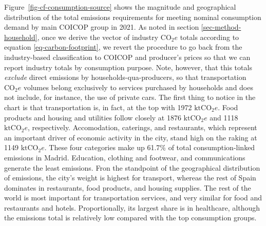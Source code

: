 \documentclass[
  10pt,
  twocolumn]{aft}
\begin{document}
Figure~\ref{fig-cf-consumption-source} shows the magnitude and
geographical distribution of the total emissions requirements for
meeting nominal consumption demand by main COICOP group in 2021. As
noted in section \ref{sec-method-household}, once we derive the vector
of industry \(\text{CO}_2e\) totals according to equation
\ref{eq-carbon-footprint}, we revert the procedure to go back from the
industry-based classification to COICOP and producer's prices so that we
can report industry totals by consumption purpose. Note, however, that
this totals \emph{exclude} direct emissions by households-qua-producers,
so that transportation \(\text{CO}_2e\) volumes belong exclusively to
services purchased by households and does not include, for instance, the
use of private cars. The first thing to notice in the chart is that
transportation is, in fact, at the top with 1972 \(\text{ktCO}_2e\).
Food products and housing and utilities follow closely at 1876
\(\text{ktCO}_2e\) and 1118 \(\text{ktCO}_2e\), respectively.
Accomodation, caterings, and restaurants, which represent an important
driver of economic activity in the city, stand high on the raking at
1149 \(\text{ktCO}_2e\). These four categories make up 61.7\% of total
consumption-linked emissions in Madrid. Education, clothing and
footwear, and communications generate the least emissions. Fron the
standpoint of the geographical distribution of emissions, the city's
weight is highest for transport, whereas the rest of Spain dominates in
restaurants, food products, and housing supplies. The rest of the world
is most important for transportation services, and very similar for food
and restaurants and hotels. Proportionally, its largest share is in
healthcare, although the emissions total is relatively low compared with
the top consumption groups.
\end{document}
